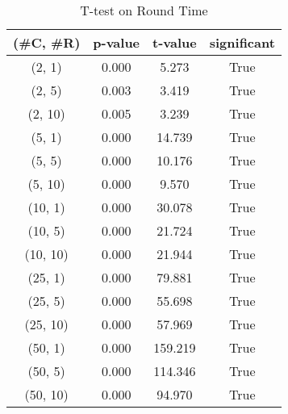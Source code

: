 \begin{table}[h]
\centering
\caption{T-test on Round Time}
\label{tab:t-testRound}
\begin{tabular}{|c|c|c|c|}
\toprule
(\#C, \#R) &  p-value &  t-value &  significant \\
\midrule
  (2, 1) &    0.000 &    5.273 &         True \\
  (2, 5) &    0.003 &    3.419 &         True \\
 (2, 10) &    0.005 &    3.239 &         True \\
  (5, 1) &    0.000 &   14.739 &         True \\
  (5, 5) &    0.000 &   10.176 &         True \\
 (5, 10) &    0.000 &    9.570 &         True \\
 (10, 1) &    0.000 &   30.078 &         True \\
 (10, 5) &    0.000 &   21.724 &         True \\
(10, 10) &    0.000 &   21.944 &         True \\
 (25, 1) &    0.000 &   79.881 &         True \\
 (25, 5) &    0.000 &   55.698 &         True \\
(25, 10) &    0.000 &   57.969 &         True \\
 (50, 1) &    0.000 &  159.219 &         True \\
 (50, 5) &    0.000 &  114.346 &         True \\
(50, 10) &    0.000 &   94.970 &         True \\
\bottomrule
\end{tabular}
\end{table}
